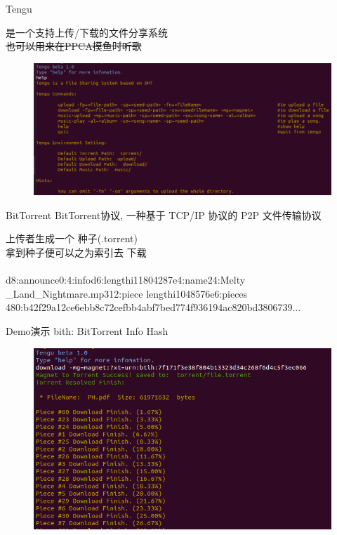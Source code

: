 \documentclass[10pt]{beamer}
\begin{document}
\begin{frame}{Tengu}

是一个支持上传/下载的文件分享系统 \\ 
\sout{也可以用来在PPCA摸鱼时听歌}

\begin{figure}
\centering
\includegraphics[scale=0.3]{figure/help.png}
\end{figure}

\end{frame}

\begin{frame}{BitTorrent}
\alert{BitTorrent协议}, 一种基于 \alert{TCP/IP} 协议的 P2P 文件传输协议

上传者生成一个 \alert{种子(.torrent)} \\
拿到种子便可以之为索引去 \alert{下载} \\

\\[20pt]

d8:announce0:4:infod6:lengthi11804287e4:name24:Melty \\
\_Land\_Nightmare.mp312:piece lengthi1048576e6:pieces \\
480:b42f29a12ce6ebb8c72cefbb4abf7bed774f936194ac820bd3806739...

\end{frame}

\begin{frame}{Demo演示}
\alert{bith:} BitTorrent Info Hash
\begin{figure}
\centering
\includegraphics[scale=0.4]{figure/download.png}
\end{figure}
\end{frame}
\end{document}
